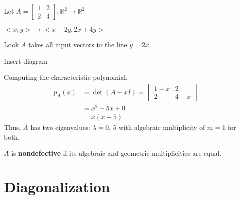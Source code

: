 \documentclass[../main.tex]{subfiles}
\begin{document}
\begin{example}[]
    Let \( A = \begin{bmatrix}
        1 & 2 \\
        2 & 4
    \end{bmatrix}
    : \mathbb{R}^2 \rightarrow \mathbb{R}^2 \)

    \( <x,y> \rightarrow <x+2y, 2x+4y> \)

    Look \( A \) takes all input vectors to the line \( y=2x \).

    Insert diagram

    Computing the characteristic polynomial,
    \begin{align*}
        p_A (x) & = \det(A-xI) = \begin{vmatrix}
            1-x & 2 \\
            2 & 4-x
        \end{vmatrix} \\
        & = x^2-5x+0 \\
        & = x(x-5)
    \end{align*}
    Thus, \( A \) has two eigenvalues: \( \lambda = 0, \, 5 \) with algebraic multiplicity of \( m =1 \) for both.
\end{example}

\begin{definition}[]
    \( A \) is \textbf{nondefective} if its algebraic and geometric multiplicities are equal.
\end{definition}


\section{Diagonalization}
\end{document}
